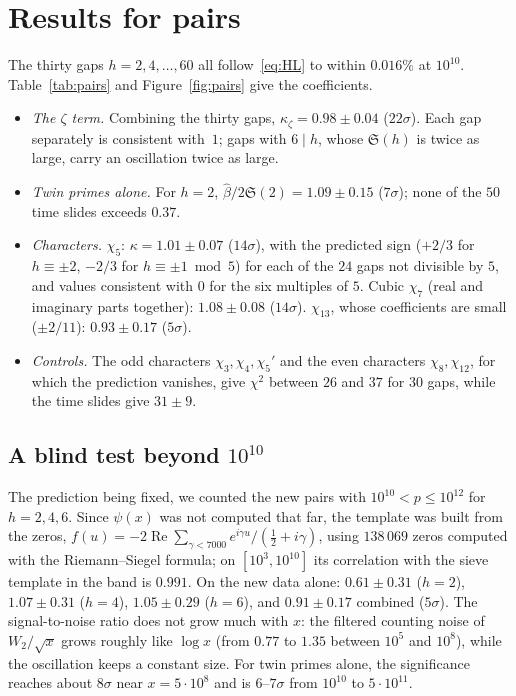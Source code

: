 \documentclass[11pt]{amsart}
\theoremstyle{remark}
\newcommand{\Sing}{\mathfrak{S}}
\begin{document}
\section{Results for pairs}

The thirty gaps $h=2,4,\dots,60$ all follow~\eqref{eq:HL} to within $0.016\%$ at $10^{10}$. Table~\ref{tab:pairs} and Figure~\ref{fig:pairs} give the coefficients.

\begin{itemize}
\item \emph{The $\zeta$ term.} Combining the thirty gaps, $\kappa_\zeta=0.98\pm0.04$ ($22\sigma$). Each gap separately is consistent with~$1$; gaps with $6\mid h$, whose $\Sing(h)$ is twice as large, carry an oscillation twice as large.
\item \emph{Twin primes alone.} For $h=2$, $\hat\beta/2\Sing(2)=1.09\pm0.15$ ($7\sigma$); none of the $50$ time slides exceeds $0.37$.
\item \emph{Characters.} $\chi_5$: $\kappa=1.01\pm0.07$ ($14\sigma$), with the predicted sign ($+2/3$ for $h\equiv\pm2$, $-2/3$ for $h\equiv\pm1\bmod 5$) for each of the $24$ gaps not divisible by $5$, and values consistent with $0$ for the six multiples of $5$. Cubic $\chi_7$ (real and imaginary parts together): $1.08\pm0.08$ ($14\sigma$). $\chi_{13}$, whose coefficients are small ($\pm2/11$): $0.93\pm0.17$ ($5\sigma$).
\item \emph{Controls.} The odd characters $\chi_3,\chi_4,\chi_5'$ and the even characters $\chi_8,\chi_{12}$, for which the prediction vanishes, give $\chi^2$ between $26$ and $37$ for $30$ gaps, while the time slides give $31\pm9$.
\end{itemize}

\subsection*{A blind test beyond $10^{10}$}
The prediction being fixed, we counted the new pairs with $10^{10}<p\le10^{12}$ for $h=2,4,6$. Since $\psi(x)$ was not computed that far, the template was built from the zeros, $f(u)=-2\operatorname{Re}\sum_{\gamma<7000}e^{i\gamma u}/(\tfrac12+i\gamma)$, using $138\,069$ zeros computed with the Riemann--Siegel formula; on $[10^3,10^{10}]$ its correlation with the sieve template in the band is $0.991$. On the new data alone: $0.61\pm0.31$ ($h=2$), $1.07\pm0.31$ ($h=4$), $1.05\pm0.29$ ($h=6$), and $0.91\pm0.17$ combined ($5\sigma$). The signal-to-noise ratio does not grow much with $x$: the filtered counting noise of $W_2/\sqrt x$ grows roughly like $\log x$ (from $0.77$ to $1.35$ between $10^5$ and $10^8$), while the oscillation keeps a constant size. For twin primes alone, the significance reaches about $8\sigma$ near $x=5\cdot10^8$ and is $6$--$7\sigma$ from $10^{10}$ to $5\cdot10^{11}$.
\end{document}
